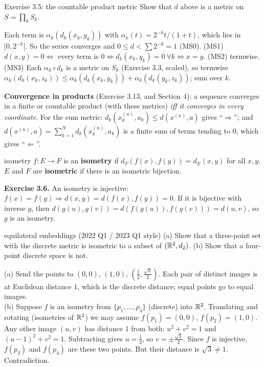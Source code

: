 \begin{exam}{Exercise 3.5: the countable product metric}
Show that $d$ above is a metric on $S=\prod_k S_k$.
\end{exam}
\begin{answer}
Each term is $\alpha_k(d_k(x_k,y_k))$ with $\alpha_k(t)=2^{-k}t/(1+t)$, which lies in
$[0,2^{-k}[$. So the series converges and $0\le d<\sum 2^{-k}=1$ (MS0).
(MS1) $d(x,y)=0\iff$ every term is $0\iff d_k(x_k,y_k)=0\ \forall k\iff x=y$.
(MS2) termwise. (MS3) Each $\alpha_k\circ d_k$ is a metric on $S_k$ (Exercise 3.3, scaled), so
termwise $\alpha_k(d_k(x_k,z_k))\le\alpha_k(d_k(x_k,y_k))+\alpha_k(d_k(y_k,z_k))$; sum over $k$.
\end{answer}

\textbf{Convergence in products} (Exercise 3.13, and Section 4): a sequence converges in a
finite or countable product (with these metrics) \emph{iff it converges in every coordinate}.
For the sum metric: $d_k(x^{(n)}_k,a_k)\le d(x^{(n)},a)$ gives ``$\Rightarrow$''; and
$d(x^{(n)},a)=\sum_{k=1}^N d_k(x^{(n)}_k,a_k)$ is a finite sum of terms tending to $0$, which gives
``$\Leftarrow$''.

\begin{defn}{isometry}
$f:E\to F$ is an \textbf{isometry} if $d_F(f(x),f(y))=d_E(x,y)$ for all $x,y$. $E$ and $F$
are \textbf{isometric} if there is an isometric bijection.
\end{defn}
\textbf{Exercise 3.6.} An isometry is injective: $f(x)=f(y)\Rightarrow d(x,y)=d(f(x),f(y))=0$.
If it is bijective with inverse $g$, then $d(g(u),g(v))=d(f(g(u)),f(g(v)))=d(u,v)$, so $g$ is an
isometry.

\begin{exam}{equilateral embeddings (2022 Q1 / 2023 Q1 style)}
(a) Show that a three-point set with the discrete metric is isometric to a subset of
$(\mathbb R^2,d_2)$. (b) Show that a four-point discrete space is not.
\end{exam}
\begin{answer}
(a) Send the points to $(0,0)$, $(1,0)$, $(\frac12,\frac{\sqrt3}2)$. Each pair of distinct
images is at Euclidean distance $1$, which is the discrete distance; equal points go to equal
images.\\
(b) Suppose $f$ is an isometry from $\{p_1,\dots,p_4\}$ (discrete) into $\mathbb R^2$. Translating and
rotating (isometries of $\mathbb R^2$) we may assume $f(p_1)=(0,0)$, $f(p_2)=(1,0)$. Any other image
$(u,v)$ has distance $1$ from both: $u^2+v^2=1$ and $(u-1)^2+v^2=1$. Subtracting gives $u=\frac12$,
so $v=\pm\frac{\sqrt3}2$. Since $f$ is injective, $f(p_3)$ and $f(p_4)$ are these two points.
But their distance is $\sqrt3\ne1$. Contradiction.
\end{answer}

